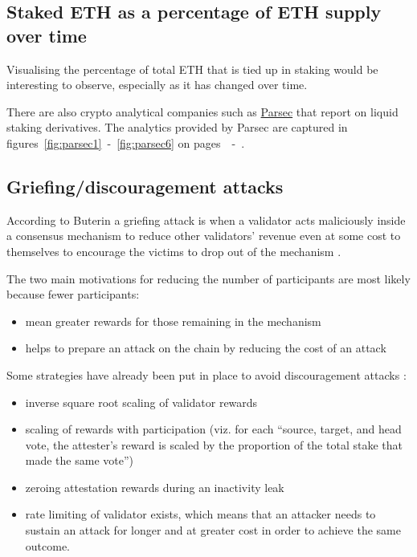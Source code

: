 \documentclass[UTF8]{article}
\begin{document}
\subsection{Staked ETH as a percentage of ETH supply over time}
Visualising the percentage of total ETH that is tied up in staking would be interesting to observe, especially as it has changed over time.

There are also crypto analytical companies such as \href{https://parsec.finance/}{Parsec} that report on liquid staking derivatives. The analytics provided by Parsec are captured in figures~\ref{fig:parsec1}~-~\ref{fig:parsec6} on pages~\pageref{fig:parsec1}~-~\pageref{fig:parsec6}.

\subsection{Griefing/discouragement attacks}
According to Buterin a griefing attack is when a validator acts maliciously inside a consensus mechanism to reduce other validators' revenue even at some cost to themselves to encourage the victims to drop out of the mechanism \cite{buterin2018c}.

The two main motivations for reducing the number of participants are most likely because fewer participants:
\begin{itemize}
\item mean greater rewards for those remaining in the mechanism
\item helps to prepare an attack on the chain by reducing the cost of an attack
\end{itemize}

Some strategies have already been put in place to avoid discouragement attacks \cite{Edgington2023}:
\begin{itemize}
\item inverse square root scaling of validator rewards
\item scaling of rewards with participation (viz. for each ``source, target, and head vote, the attester's reward is scaled by the proportion of the total stake that made the same vote'')
\item zeroing attestation rewards during an inactivity leak
\item rate limiting of validator exists, which means that an attacker needs to sustain an attack for longer and at greater cost in order to achieve the same outcome.
\end{itemize}
\end{document}
